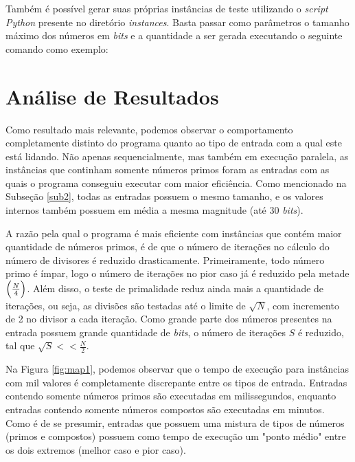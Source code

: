 \documentclass[a4paper, 12pt]{article}
\begin{document}
Também é possível gerar suas próprias instâncias de teste utilizando o \emph{script Python} presente no diretório \emph{instances}. Basta passar como parâmetros o tamanho máximo dos números em \emph{bits} e a quantidade a ser gerada executando o seguinte comando como exemplo:

\begin{center}
\end{center}

\section{Análise de Resultados}

Como resultado mais relevante, podemos observar o comportamento completamente distinto do programa quanto ao tipo de entrada com a qual este está lidando. Não apenas sequencialmente, mas também em execução paralela, as instâncias que continham somente números primos foram as entradas com as quais o programa conseguiu executar com maior eficiência. Como mencionado na Subseção \ref{sub2}, todas as entradas possuem o mesmo tamanho, e os valores internos também possuem em média a mesma magnitude (até 30 \emph{bits}).

A razão pela qual o programa é mais eficiente com instâncias que contém maior quantidade de números primos, é de que o número de iterações no cálculo do número de divisores é reduzido drasticamente. Primeiramente, todo número primo é ímpar, logo o número de iterações no pior caso já é reduzido pela metade $\Bigl(\frac{N}{4}\Bigl)$. Além disso, o teste de primalidade reduz ainda mais a quantidade de iterações, ou seja, as divisões são testadas até o limite de \(\sqrt{N}\), com incremento de 2 no divisor a cada iteração. Como grande parte dos números presentes na entrada possuem grande quantidade de \emph{bits}, o número de iterações \(S\) é reduzido, tal que \(\sqrt{S} << \frac{N}{2}\).

Na Figura \ref{fig:map1}, podemos observar que o tempo de execução para instâncias com mil valores é completamente discrepante entre os tipos de entrada. Entradas contendo somente números primos são executadas em milissegundos, enquanto entradas contendo somente números compostos são executadas em minutos. Como é de se presumir, entradas que possuem uma mistura de tipos de números (primos e compostos) possuem como tempo de execução um "ponto médio" \hspace{0.1cm}entre os dois extremos (melhor caso e pior caso).
\end{document}
